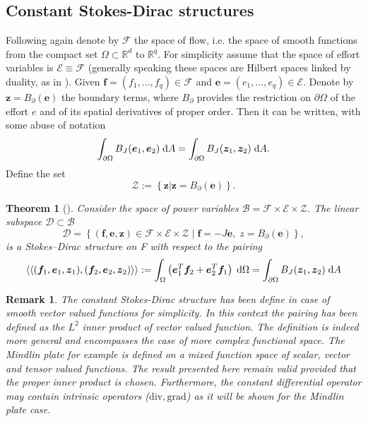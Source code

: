\documentclass[preprint,12pt]{elsarticle}
\newtheorem{theorem}{Theorem}
\newtheorem{remark}{Remark}
\begin{document}
{\subsection{Constant Stokes-Dirac structures}
Following again \cite{MacchelliModelling} denote by $\mathcal{F}$ the space of flow, i.e. the space of smooth functions from the compact set $\Omega \subset \mathbb{R}^d$ to $\mathbb{R}^q$. For simplicity assume that  the space of effort variables is $\mathcal{E} \equiv \mathcal{F}$ (generally speaking these spaces are Hilbert spaces linked by duality, as in \cite{Villegas}). Given $\bm{f} = (f_1, \dots, f_q) \in \mathcal{F}$ and $\bm{e} = (e_1, \dots, e_q) \in \mathcal{E}$. Denote by $\bm{z} = B_\partial(\bm{e})$ the boundary terms, where $B_\partial$ provides the restriction on $\partial\Omega$ of the effort $e$ and of its spatial derivatives of proper order. Then it can be written, with some abuse of notation
\begin{equation}
\int_{\partial \Omega} B_J(\bm{e}_1, \bm{e}_2) \d{A} = \int_{\partial \Omega} B_J(\bm{z}_1, \bm{z}_2) \d{A}.
\end{equation}
Define the set
\begin{equation}
	\mathcal{Z} := \left\{ \bm{z} \vert \bm{z} = B_{\partial}(\bm{e})  \right\}.
\end{equation}
\begin{theorem}[\cite{MacchelliModelling}]
	\label{th:StokesDirac}
Consider the space of power variables $\mathcal{B} = \mathcal{F} \times \mathcal{E} \times \mathcal{Z}$. The linear subspace $\mathcal{D} \subset \mathcal{B}$
\begin{equation}
\mathcal{D} = \left\{ (\bm{f}, \bm{e}, \bm{z}) \in  \mathcal{F} \times \mathcal{E} \times \mathcal{Z} \; \vert \; \bm{f} = -J \bm{e}, \; z = B_\partial(\bm{e}) \right\},
\end{equation}
is a Stokes–Dirac structure on F with respect to the pairing
\begin{equation}
\left\langle \left\langle (\bm{f}_1, \bm{e}_1, \bm{z}_1), (\bm{f}_2, \bm{e}_2, \bm{z}_2) \right\rangle \right\rangle  := \int_{\Omega} \left( \bm{e}_1^T \bm{f}_2 + \bm{e}_2^T \bm{f}_1 \right) \d\Omega= \int_{\partial \Omega} B_J(\bm{z}_1, \bm{z}_2) \d{A} 
\end{equation}
\end{theorem}
\begin{remark}
The constant Stokes-Dirac structure has been define in case of smooth vector valued functions for simplicity. In this context the pairing has been defined as the $L^2$ inner product of vector valued function. The definition is indeed more general and encompasses the case of more complex functional space. The Mindlin plate for example is defined on a mixed function space of scalar, vector and tensor valued functions. The result presented here remain valid provided that the proper inner product is chosen. Furthermore, the constant differential operator may contain intrinsic operators ($\mathrm{div}, \mathrm{grad}$) as it will be shown for the Mindlin plate case.
\end{remark}
}
\end{document}
